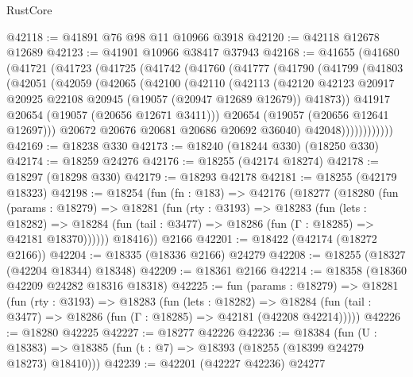\begin{lexlean}{RustCore}
\begin{coremodule}
@42118 := @41891 @76 @98 @11 @10966 @3918
@42120 := @42118 @12678 @12689
@42123 := @41901 @10966 @38417 @37943
@42168 := @41655
    (@41680
      (@41721
        (@41723
          (@41725
            (@41742
              (@41760
                (@41777
                  (@41790
                    (@41799
                      (@41803
                        (@42051
                          (@42059
                            (@42065
                              (@42100
                                (@42110
                                  (@42113
                                    (@42120
                                      @42123
                                      @20917
                                      @20925
                                      @22108
                                      @20945
                                      (@19057 (@20947 @12689 @12679))
                                      @41873))
                                  @41917
                                  @20654
                                  (@19057 (@20656 @12671 @3411)))
                                @20654
                                (@19057 (@20656 @12641 @12697)))
                              @20672
                              @20676
                              @20681
                              @20686
                              @20692
                              @36040)
                            @42048))))))))))))
@42169 := @18238 @330
@42173 := @18240 (@18244 @330) (@18250 @330)
@42174 := @18259 @24276
@42176 := @18255 (@42174 @18274)
@42178 := @18297 (@18298 @330)
@42179 := @18293 @42178
@42181 := @18255 (@42179 @18323)
@42198 := @18254
    (fun (fn : @183) =>
    @42176
      (@18277
        (@18280
          (fun (params : @18279) =>
          @18281
            (fun (rty : @3193) =>
            @18283
              (fun (lets : @18282) =>
              @18284 (fun (tail : @3477) => @18286 (fun (Γ : @18285) => @42181 @18370))))))
        @18416))
    @2166
@42201 := @18422 (@42174 (@18272 @2166))
@42204 := @18335 (@18336 @2166) @24279
@42208 := @18255 (@18327 (@42204 @18344) @18348)
@42209 := @18361 @2166
@42214 := @18358 (@18360 @42209 @24282 @18316 @18318)
@42225 := fun (params : @18279) =>
  @18281
    (fun (rty : @3193) =>
    @18283
      (fun (lets : @18282) =>
      @18284 (fun (tail : @3477) => @18286 (fun (Γ : @18285) => @42181 (@42208 @42214)))))
@42226 := @18280 @42225
@42227 := @18277 @42226
@42236 := @18384
    (fun (U : @18383) => @18385 (fun (t : @7) => @18393 (@18255 (@18399 @24279 @18273) @18410)))
@42239 := @42201 (@42227 @42236) @24277

\end{coremodule}
\end{lexlean}
